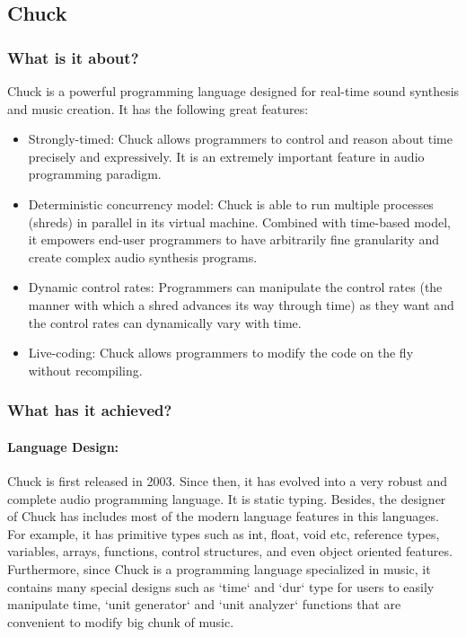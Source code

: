 \subsection{Chuck}

	\subsubsection{What is it about?}

	Chuck is a powerful programming language designed for real-time sound synthesis and music creation\cite{WangCook02}.  It has the following great features\cite{Wang08}:
	\begin{itemize}
	\item Strongly-timed: Chuck allows programmers to control and reason about time precisely and expressively. It is an extremely important feature in audio programming paradigm.
	\item Deterministic concurrency model: Chuck is able to run multiple processes (shreds) in parallel in its virtual machine. Combined with time-based model, it empowers end-user programmers to have arbitrarily fine granularity and create complex audio synthesis programs. 
	\item Dynamic control rates: Programmers can manipulate the control rates (the manner with which a shred advances its way through time\cite{Wang08}) as they want and the control rates can dynamically vary with time.
	\item Live-coding:  Chuck allows programmers to modify the code on the fly without recompiling.
	\end{itemize}

	\subsubsection{What has it achieved?}
		\paragraph{Language Design:}
			Chuck is first released in 2003\cite{Wang15}. Since then, it has evolved into a very robust and complete audio programming language. It is static typing. Besides, the designer of Chuck has includes most of the modern language features in this languages. For example, it has primitive types such as int, float, void etc, reference types, variables, arrays, functions, control structures, and even object oriented features. Furthermore, since Chuck is a programming language specialized in music, it contains many special designs such as `time` and `dur` type for users to easily manipulate time, `unit generator` and `unit analyzer` functions that are convenient to modify big chunk of music.
